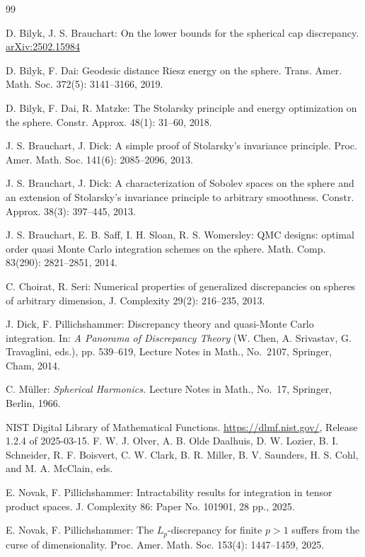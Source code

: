 \documentclass[12pt]{article}
\begin{document}
\newpage

\begin{thebibliography}{99}

 D. Bilyk, J. S. Brauchart: On the lower bounds for the spherical cap discrepancy. \url{arXiv:2502.15984}

 D. Bilyk, F. Dai: Geodesic distance Riesz energy on the sphere. Trans. Amer. Math. Soc. 372(5): 3141--3166, 2019.

 D. Bilyk, F. Dai, R. Matzke: The Stolarsky principle and energy optimization on the sphere. Constr. Approx. 48(1): 31--60, 2018.

 J. S. Brauchart, J. Dick: A simple proof of Stolarsky's invariance principle. Proc. Amer. Math. Soc. 141(6): 2085--2096, 2013.

J. S. Brauchart, J. Dick: A characterization of Sobolev spaces on the sphere and an extension of Stolarsky's invariance principle to arbitrary smoothness. Constr. Approx. 38(3): 397--445, 2013.

J. S. Brauchart, E. B. Saff, I. H. Sloan, R. S. Womersley: QMC designs: optimal order quasi Monte Carlo integration schemes on the sphere. Math. Comp. 83(290): 2821--2851, 2014.

 C. Choirat, R. Seri: Numerical properties of generalized discrepancies on spheres of arbitrary dimension, J. Complexity 29(2): 216--235, 2013.

 J. Dick, F. Pillichshammer: Discrepancy theory and quasi-Monte Carlo integration. In: {\em A Panorama of Discrepancy Theory} (W. Chen, A. Srivastav, G. Travaglini, eds.), pp. 539--619, Lecture Notes in Math., No.~2107, Springer, Cham, 2014.

 C. Müller: {\em Spherical Harmonics.} Lecture Notes in Math., No.~17, Springer, Berlin, 1966.

NIST Digital Library of Mathematical Functions. \url{https://dlmf.nist.gov/}, Release 1.2.4 of 2025-03-15. F. W. J. Olver, A. B. Olde Daalhuis, D. W. Lozier, B. I. Schneider, R. F. Boisvert, C. W. Clark, B. R. Miller, B. V. Saunders, H. S. Cohl, and M. A. McClain, eds.

 E. Novak, F. Pillichshammer: Intractability results for integration in tensor product spaces. J. Complexity 86: Paper No. 101901, 28 pp., 2025.

 E. Novak, F. Pillichshammer: The $L_p$-discrepancy for finite $p>1$ suffers from the curse of dimensionality. Proc. Amer. Math. Soc. 153(4): 1447--1459, 2025.


\end{thebibliography}
\end{document}
